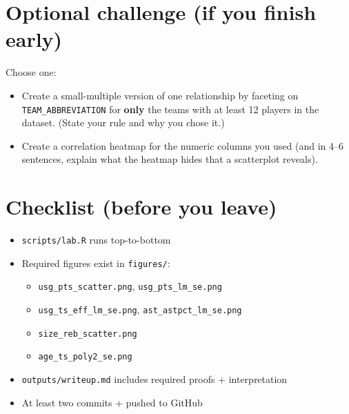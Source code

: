 \documentclass[11pt]{article}
\begin{document}
\section*{Optional challenge (if you finish early)}
Choose one:
\begin{itemize}
  \item Create a small-multiple version of one relationship by faceting on \texttt{TEAM\_ABBREVIATION} for \textbf{only} the teams with at least 12 players in the dataset. (State your rule and why you chose it.)
  \item Create a correlation heatmap for the numeric columns you used (and in 4--6 sentences, explain what the heatmap hides that a scatterplot reveals).
\end{itemize}

\section*{Checklist (before you leave)}
\begin{itemize}
  \item \texttt{scripts/lab.R} runs top-to-bottom
  \item Required figures exist in \texttt{figures/}:
  \begin{itemize}
    \item \texttt{usg\_pts\_scatter.png}, \texttt{usg\_pts\_lm\_se.png}
    \item \texttt{usg\_ts\_eff\_lm\_se.png}, \texttt{ast\_astpct\_lm\_se.png}
    \item \texttt{size\_reb\_scatter.png}
    \item \texttt{age\_ts\_poly2\_se.png}
  \end{itemize}
  \item \texttt{outputs/writeup.md} includes required proofs + interpretation
  \item At least two commits + pushed to GitHub
\end{itemize}
\end{document}
